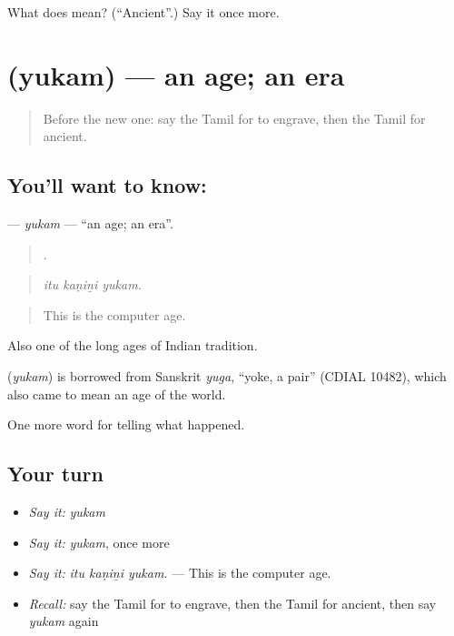 \begin{tcolorbox}[breakable,colback=teal!4,colframe=teal!35!black,title={Before you move on}]
What does  mean? (\textquotedblleft{}Ancient\textquotedblright{}.) Say it once more.
\end{tcolorbox}
\section[\texorpdfstring{\ta{யுகம்} (yukam)}{யுகம் (yukam)}]{ (yukam) — an age; an era}

\label{lesson:TA-C342-yukam}



\begin{quote}
Before the new one: say the Tamil for to engrave, then the Tamil for ancient.
\end{quote}

\subsection*{You'll want to know: }
\textbf{} — \emph{yukam} — \textquotedblleft{}an age; an era\textquotedblright{}.

\begin{quote}
  .
\end{quote}

\begin{quote}
\emph{itu kaṇiṉi yukam.}
\end{quote}

\begin{quote}
This is the computer age.
\end{quote}

Also one of the long ages of Indian tradition.

\begin{cousinweb}
\textbf{} (\emph{yukam}) is borrowed from Sanskrit \emph{yuga}, \textquotedblleft{}yoke, a pair\textquotedblright{} (CDIAL 10482), which also came to mean an age of the world.
\end{cousinweb}

\begin{grammarlens}[title={What you've built}]
One more word for telling what happened.
\end{grammarlens}

\subsection*{Your turn}
\begin{itemize}
\raggedright
  \item \emph{Say it:} \emph{yukam}
  \item \emph{Say it:} \emph{yukam}, once more
  \item \emph{Say it:} \emph{itu kaṇiṉi yukam.} — This is the computer age.
  \item \emph{Recall:} say the Tamil for to engrave, then the Tamil for ancient, then say \emph{yukam} again
\end{itemize}

